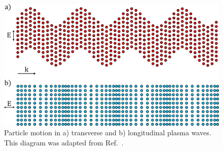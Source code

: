 \begin{figure}[t!]
    \includegraphics[width=0.75\linewidth]{Theory/Images/plasma_waves.png}
    \centering
    \caption{Particle motion in a) transverse and b) longitudinal plasma waves.
    This diagram was adapted from Ref.~\cite{michel_introduction_2023}.}%
    \label{fig:theory_plasma_waves}
\end{figure}

